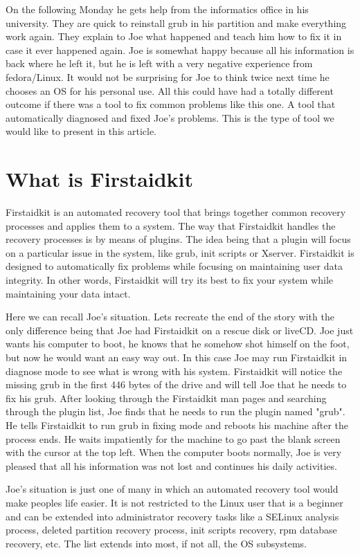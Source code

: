 \documentclass[a4paper,13pt]{article}
\begin{document}
On the following Monday he gets help from the informatics office in his university.  They are quick to reinstall grub in his partition and make everything work again.  They explain to Joe what happened and teach him how to fix it in case it ever happened again.  Joe is somewhat happy because all his information is back where he left it, but he is left with a very negative experience from fedora/Linux.  It would not be surprising for Joe to think twice next time he chooses an OS for his personal use.  All this could have had a totally different outcome if there was a tool to fix common problems like this one.  A tool that automatically diagnosed and fixed Joe's problems.  This is the type of tool we would like to present in this article.

\section{What is Firstaidkit}
Firstaidkit is an automated recovery tool that brings together common recovery processes and applies them to a system.  The way that Firstaidkit handles the recovery processes is by means of plugins.  The idea being that a plugin will focus on a particular issue in the system, like grub, init scripts or Xserver.  Firstaidkit is designed to automatically fix problems while focusing on maintaining user data integrity.  In other words, Firstaidkit will try its best to fix your system while maintaining your data intact.

Here we can recall Joe's situation.  Lets recreate the end of the story with the only difference being that Joe had Firstaidkit on a rescue disk or liveCD.  Joe just wants his computer to boot, he knows that he somehow shot himself on the foot, but now he would want an easy way out.  In this case Joe may run Firstaidkit in diagnose mode to see what is wrong with his system.  Firstaidkit will notice the missing grub in the first 446 bytes of the drive and will tell Joe that he needs to fix his grub.  After looking through the Firstaidkit man pages and searching through the plugin list, Joe finds that he needs to run the plugin named "grub".  He tells Firstaidkit to run grub in fixing mode and reboots his machine after the process ends.  He waits impatiently for the machine to go past the blank screen with the cursor at the top left.  When the computer boots normally, Joe is very pleased that all his information was not lost and continues his daily activities.

Joe's situation is just one of many in which an automated recovery tool would make peoples life easier.  It is not restricted to the Linux user that is a beginner and can be extended into administrator recovery tasks like a SELinux analysis process, deleted partition recovery process, init scripts recovery, rpm database recovery, etc.  The list extends into most, if not all, the OS subsystems.
\end{document}
